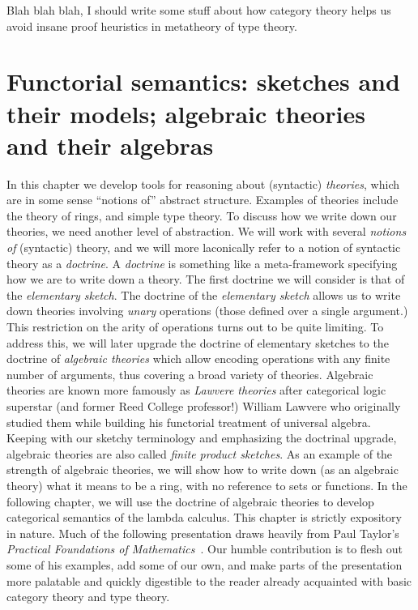 \documentclass[12pt,twoside]{reedthesis}
\theoremstyle{definition}
\theoremstyle{remark}
\theoremstyle{plain}
\begin{document}

Blah blah blah, I should write some stuff about how category theory helps us
avoid insane proof heuristics in metatheory of type theory.

\chapter{Functorial semantics: sketches and their models; algebraic theories and their algebras}
In this chapter we develop tools for reasoning about (syntactic)
\emph{theories}, which are in some sense ``notions of'' abstract structure.
Examples of theories include the theory of rings, and simple type theory. To
discuss how we write down our theories, we need another level of abstraction. We
will work with several \emph{notions of} (syntactic) theory, and we will more
laconically refer to a notion of syntactic theory as a \emph{doctrine}. A
\emph{doctrine} is something like a meta-framework specifying how we are to
write down a theory. The first doctrine we will consider is that of the
\emph{elementary sketch}. %
The doctrine of the \emph{elementary sketch} allows us to write down theories
involving \emph{unary} operations (those defined over a single argument.) This
restriction on the arity of operations turns out to be quite limiting. To
address this, we will later upgrade the doctrine of elementary sketches to the
doctrine of \emph{algebraic theories} which allow encoding operations with any
finite number of arguments, thus covering a broad variety of theories. Algebraic
theories are known more famously as \emph{Lawvere theories} after categorical
logic superstar (and former Reed College professor!) William Lawvere who
originally studied them while building his functorial treatment of universal
algebra. Keeping with our sketchy terminology and emphasizing the doctrinal
upgrade, algebraic theories are also called \emph{finite product sketches}. As
an example of the strength of algebraic theories, we will show how to write down
(as an algebraic theory) what it means to be a ring, with no reference to sets
or functions. In the following chapter, we will use the doctrine of algebraic
theories to develop categorical semantics of the lambda calculus. This chapter
is strictly expository in nature. Much of the following presentation draws
heavily from Paul Taylor's \emph{Practical Foundations of
  Mathematics}~\cite{taylor_practical_1999}. Our humble contribution is to flesh
out some of his examples, add some of our own, and make parts of the
presentation more palatable and quickly digestible to the reader already
acquainted with basic category theory and type theory.
\end{document}
